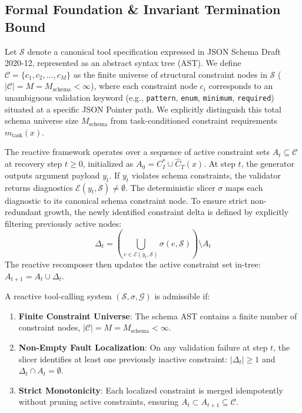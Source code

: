 \subsection{Formal Foundation \& Invariant Termination Bound}
\label{sec:formal_proof}

Let $\mathcal{S}$ denote a canonical tool specification expressed in JSON Schema Draft 2020-12, represented as an abstract syntax tree (AST). We define $\mathcal{C} = \{c_1, c_2, \dots, c_M\}$ as the finite universe of structural constraint nodes in $\mathcal{S}$ ($|\mathcal{C}| = M = M_{\text{schema}} < \infty$), where each constraint node $c_i$ corresponds to an unambiguous validation keyword (e.g., \texttt{pattern}, \texttt{enum}, \texttt{minimum}, \texttt{required}) situated at a specific JSON Pointer path. We explicitly distinguish this total schema universe size $M_{\text{schema}}$ from task-conditioned constraint requirements $m_{\text{task}}(x)$.

The reactive framework operates over a sequence of active constraint sets $A_t \subseteq \mathcal{C}$ at recovery step $t \ge 0$, initialized as $A_0 = C_I^* \cup \widehat{C}_T(x)$. At step $t$, the generator outputs argument payload $y_t$. If $y_t$ violates schema constraints, the validator returns diagnostics $\mathcal{E}(y_t, \mathcal{S}) \neq \emptyset$. The deterministic slicer $\sigma$ maps each diagnostic to its canonical schema constraint node. To ensure strict non-redundant growth, the newly identified constraint delta is defined by explicitly filtering previously active nodes:
\begin{equation}
\Delta_t = \left( \bigcup_{e \in \mathcal{E}(y_t, \mathcal{S})} \sigma(e, \mathcal{S}) \right) \setminus A_t
\end{equation}
The reactive recomposer then updates the active constraint set in-tree: $A_{t+1} = A_t \cup \Delta_t$.

\begin{definition}
A reactive tool-calling system $(\mathcal{S}, \sigma, \mathcal{G})$ is admissible if:
\begin{enumerate}
    \item \textbf{Finite Constraint Universe}: The schema AST contains a finite number of constraint nodes, $|\mathcal{C}| = M = M_{\text{schema}} < \infty$.
    \item \textbf{Non-Empty Fault Localization}: On any validation failure at step $t$, the slicer identifies at least one previously inactive constraint: $|\Delta_t| \ge 1$ and $\Delta_t \cap A_t = \emptyset$.
    \item \textbf{Strict Monotonicity}: Each localized constraint is merged idempotently without pruning active constraints, ensuring $A_t \subset A_{t+1} \subseteq \mathcal{C}$.
\end{enumerate}
\end{definition}

